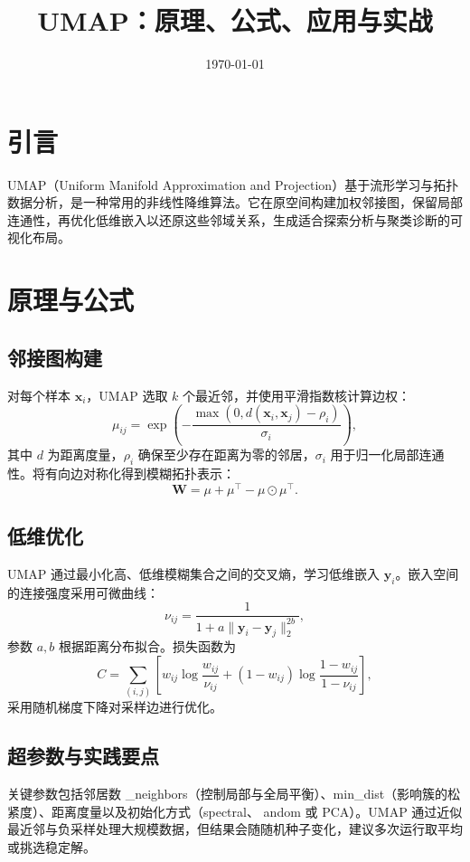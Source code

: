 \documentclass[UTF8,zihao=-4]{ctexart}
\title{UMAP：原理、公式、应用与实战}
\author{}
\date{\today}
\begin{document}
\maketitle

\section{引言}
UMAP（Uniform Manifold Approximation and Projection）基于流形学习与拓扑数据分析，是一种常用的非线性降维算法。它在原空间构建加权邻接图，保留局部连通性，再优化低维嵌入以还原这些邻域关系，生成适合探索分析与聚类诊断的可视化布局。

\section{原理与公式}
\subsection{邻接图构建}
对每个样本 \(\mathbf{x}_i\)，UMAP 选取 \(k\) 个最近邻，并使用平滑指数核计算边权：
\begin{equation}
\mu_{ij} = \exp\left(-\frac{\max(0, d(\mathbf{x}_i, \mathbf{x}_j) - \rho_i)}{\sigma_i}\right),
\end{equation}
其中 \(d\) 为距离度量，\(\rho_i\) 确保至少存在距离为零的邻居，\(\sigma_i\) 用于归一化局部连通性。将有向边对称化得到模糊拓扑表示：
\begin{equation}
\mathbf{W} = \mu + \mu^{\top} - \mu \odot \mu^{\top}.
\end{equation}

\subsection{低维优化}
UMAP 通过最小化高、低维模糊集合之间的交叉熵，学习低维嵌入 \(\mathbf{y}_i\)。嵌入空间的连接强度采用可微曲线：
\begin{equation}
\nu_{ij} = \frac{1}{1 + a\lVert \mathbf{y}_i - \mathbf{y}_j \rVert_2^{2b}},
\end{equation}
参数 \(a, b\) 根据距离分布拟合。损失函数为
\begin{equation}
C = \sum_{(i,j)} \left[ w_{ij} \log \frac{w_{ij}}{\nu_{ij}} + (1 - w_{ij}) \log \frac{1 - w_{ij}}{1 - \nu_{ij}} \right],
\end{equation}
采用随机梯度下降对采样边进行优化。

\subsection{超参数与实践要点}
关键参数包括邻居数 
_neighbors（控制局部与全局平衡）、min_dist（影响簇的松紧度）、距离度量以及初始化方式（spectral、
andom 或 PCA）。UMAP 通过近似最近邻与负采样处理大规模数据，但结果会随随机种子变化，建议多次运行取平均或挑选稳定解。
\end{document}
